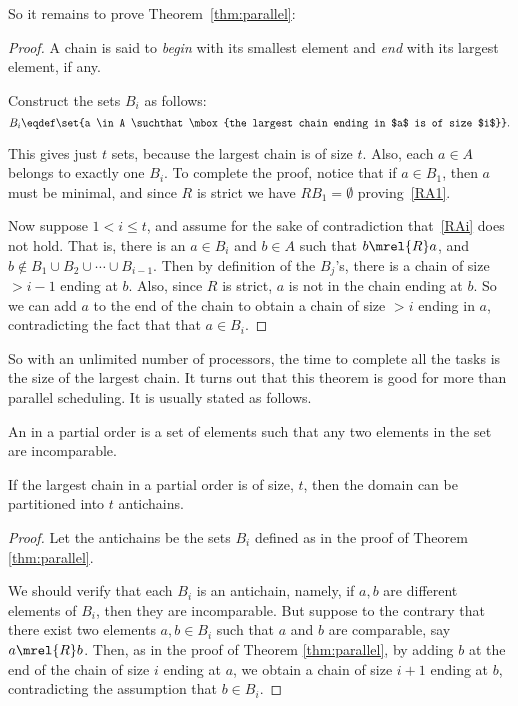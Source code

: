 So it remains to prove Theorem~\ref{thm:parallel}:
\begin{proof}
A chain is said to \emph{begin} with its smallest element and \emph{end}
with its largest element, if any.

Construct the sets $B_i$ as follows:
\[
B_i \eqdef \set{a \in A \suchthat \mbox{the largest chain ending in $a$ is of
    size $i$}}.
\]

This gives just $t$ sets, because the largest chain is of size $t$.  Also,
each $a \in A$ belongs to exactly one $B_i$.  To complete the proof,
notice that if $a \in B_1$, then $a$ must be minimal, and since $R$ is
strict we have $RB_1 = \emptyset$ proving~\eqref{RA1}.


Now suppose $1 <i \le t$, and assume for the sake of contradiction
that~\eqref{RAi} does not hold.  That is, there is an $a \in B_i$ and $b
\in A$ such that $b \mrel{R} a$, and $b \notin B_1 \cup B_2 \cup \cdots
\cup B_{i-1}$.  Then by definition of the $B_j$'s, there is a chain of
size $> i-1$ ending at $b$.  Also, since $R$ is strict, $a$ is not in the
chain ending at $b$.  So we can add $a$ to the end of the chain to obtain
a chain of size $>i$ ending in $a$, contradicting the fact that that $a
\in B_i$.
\end{proof}

So with an unlimited number of processors, the time to complete all the
tasks is the size of the largest chain.  It turns out that this theorem
is good for more than parallel scheduling.  It is usually stated as
follows.

\begin{definition}
An  in a partial order is a set of elements such that any
two elements in the set are incomparable.
\end{definition}

\begin{corollary}\label{cor:parallel}
If the largest chain in a partial order is of size, $t$, then the domain
can be partitioned into $t$ antichains.
\end{corollary}

\begin{proof}
Let the antichains be the sets $B_i$ defined as in the proof of Theorem
\ref{thm:parallel}.

We should verify that each $B_i$ is an antichain, namely, if $a,b$ are
different elements of $B_i$, then they are incomparable.  But suppose to
the contrary that there exist two elements $a,b \in B_i$ such that $a$ and
$b$ are comparable, say $a \mrel{R} b$.  Then, as in the proof of Theorem
\ref{thm:parallel}, by adding $b$ at the end of the chain of size $i$
ending at $a$, we obtain a chain of size $i+1$ ending at $b$,
contradicting the assumption that $b\in B_i$.
\end{proof}

